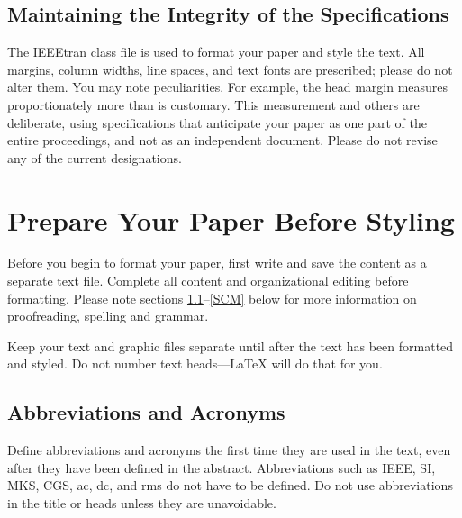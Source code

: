 \documentclass[conference]{IEEEtran}
\begin{document}
\subsection{Maintaining the Integrity of the Specifications}

The IEEEtran class file is used to format your paper and style the text. All margins, 
column widths, line spaces, and text fonts are prescribed; please do not 
alter them. You may note peculiarities. For example, the head margin
measures proportionately more than is customary. This measurement 
and others are deliberate, using specifications that anticipate your paper 
as one part of the entire proceedings, and not as an independent document. 
Please do not revise any of the current designations.

\section{Prepare Your Paper Before Styling}
Before you begin to format your paper, first write and save the content as a 
separate text file. Complete all content and organizational editing before 
formatting. Please note sections \ref{AA}--\ref{SCM} below for more information on 
proofreading, spelling and grammar.

Keep your text and graphic files separate until after the text has been 
formatted and styled. Do not number text heads---{\LaTeX} will do that 
for you.

\subsection{Abbreviations and Acronyms}\label{AA}
Define abbreviations and acronyms the first time they are used in the text, 
even after they have been defined in the abstract. Abbreviations such as 
IEEE, SI, MKS, CGS, ac, dc, and rms do not have to be defined. Do not use 
abbreviations in the title or heads unless they are unavoidable.
\end{document}

